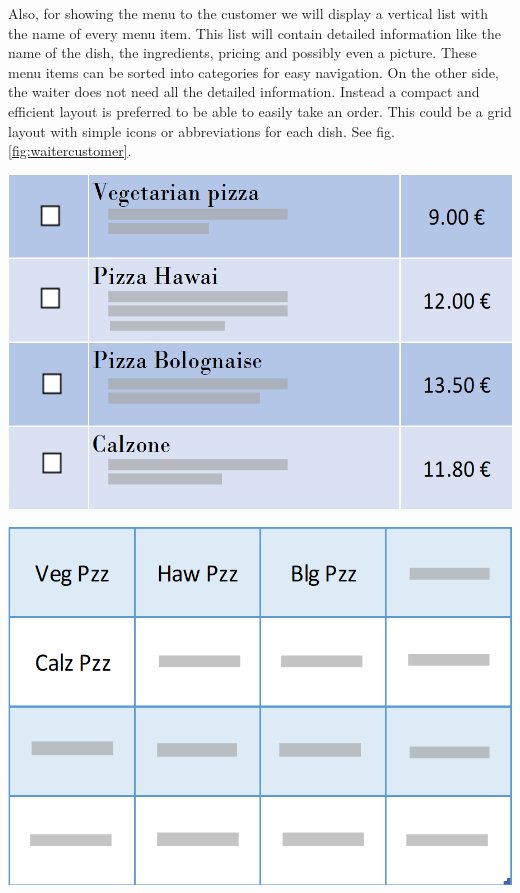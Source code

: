\documentclass[12pt]{article}
\newenvironment{Figure}
	{\par\medskip\noindent\minipage{\linewidth}}
	{\endminipage\par\medskip}
\begin{document}
\begin{multicols}{2}
Also, for showing the menu to the customer we will display a vertical list with the name of every menu item. This list will contain detailed information like the name of the dish, the ingredients, pricing and possibly even a picture. These menu items can be sorted into categories for easy navigation. On the other side, the waiter does not need all the detailed information. Instead a compact and efficient layout is preferred to be able to easily take an order. This could be a grid layout with simple icons or abbreviations for each dish. See fig. \ref{fig:waitercustomer}.
\begin{Figure}
		\includegraphics[width=\linewidth]{illustrations/customermenu.PNG}
		\label{fig:menucustomer}
\end{Figure}
\begin{Figure}
	\includegraphics[width=\linewidth]{illustrations/waitermenu.PNG}

\end{Figure}
\end{multicols}
\end{document}
